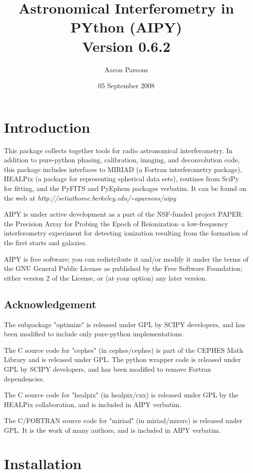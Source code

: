 \documentclass[10pt]{article}
\title{Astronomical Interferometry in PYthon (AIPY)\\
Version 0.6.2}
\author{Aaron Parsons}
\date{05 September 2008}
\begin{document}
\maketitle
\tableofcontents 

\section{Introduction}

This package collects together tools for radio astronomical interferometry.  In
addition to pure-python phasing, calibration, imaging, and
deconvolution code, this package includes interfaces to MIRIAD (a Fortran
interferometry package), HEALPix (a package for representing spherical data
sets), routines from SciPy for fitting, and the PyFITS and PyEphem packages
verbatim.  It can be found on the web at
{\it http://setiathome.berkeley.edu/\~{}aparsons/aipy}

AIPY is under active development as a part of the NSF-funded project
PAPER: the Precision Array for Probing the Epoch of Reionization--a 
low-frequency interferometry experiment for detecting ionization resulting
from the formation of the first starts and galaxies.

AIPY is free software; you can redistribute it and/or modify it under
the terms of the GNU General Public License as published by the Free Software
Foundation; either version 2 of the License, or (at your option) any later
version.

\subsection{Acknowledgement}

The subpackage "optimize" is released under GPL by SCIPY developers, and
has been modified to include only pure-python implementations.

The C source code for "cephes" (in cephes/cephes) is part of the CEPHES Math
Library and is released under GPL.  The python wrapper code is released under
GPL by SCIPY developers, and has been modified to remove Fortran dependencies.

The C source code for "healpix" (in healpix/cxx) is released under GPL
by the HEALPix collaboration, and is included in AIPY verbatim.

The C/FORTRAN source code for "miriad" (in miriad/mirsrc) is released under
GPL. It is the work of many authors, and is included in AIPY verbatim.

\section{Installation}
\end{document}
